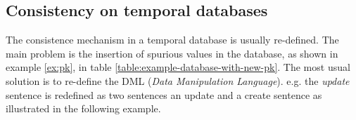 \begin{example}
\begin{table}


\end{table}


\end{example}

\subsection{\label{subsubsec:consistency}Consistency on temporal databases}
The consistence mechanism in a temporal database is usually re-defined. The main problem is the insertion of spurious values in the database, as shown in example \ref{ex:pk}, in table \ref{table:example-database-with-new-pk}. The most usual solution is to re-define the DML (\emph{Data Manipulation Language}). e.g. the \emph{update} sentence is redefined as two sentences an update and a create sentence as illustrated in the following example.

